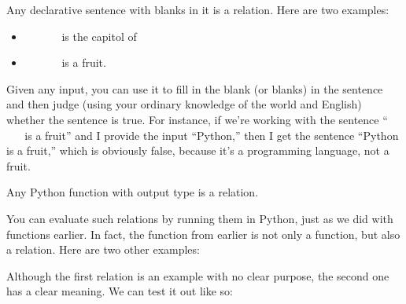 \documentclass[letterpaper,10pt,english]{jupyterBook}
\begin{document}
\sphinxAtStartPar
{} Any declarative sentence with blanks in it is a relation.  Here are two examples:
\begin{itemize}
\item {} 
\sphinxAtStartPar
        is the capitol of        

\item {} 
\sphinxAtStartPar
        is a fruit.

\end{itemize}

\sphinxAtStartPar
Given any input, you can use it to fill in the blank (or blanks) in the sentence and then judge (using your ordinary knowledge of the world and English) whether the sentence is true.  For instance, if we’re working with the sentence “        is a fruit” and I provide the input “Python,” then I get the sentence “Python is a fruit,” which is obviously false, because it’s a programming language, not a fruit.

\sphinxAtStartPar
{} Any Python function with output type  is a relation.

\sphinxAtStartPar
You can evaluate such relations by running them in Python, just as we did with functions earlier.  In fact, the  function from earlier is not only a function, but also a relation.  Here are two other examples:

\begin{sphinxVerbatim}[commandchars=\\\{\}]
     
       \PYG{p}{[}\PYG{p}{]}

    
       \PYG{p}{[}\PYG{p}{]}
\end{sphinxVerbatim}

\sphinxAtStartPar
Although the first relation is an example with no clear purpose, the second one has a clear meaning.  We can test it out like so:

\begin{sphinxVerbatim}[commandchars=\\\{\}]
     
\end{sphinxVerbatim}
\end{document}
